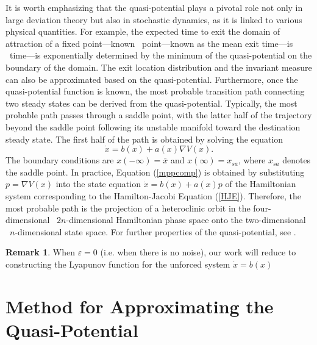 \documentclass[11pt]{article}
\theoremstyle{plain}      %
\theoremstyle{definition} %
\newtheorem{remark}[theorem]{Remark}
\providecommand{\DIFaddtex}[1]{{\protect\color{blue}#1}} %
\providecommand{\DIFdeltex}[1]{{\protect\color{red}#1}} %
\providecommand{\DIFaddbegin}{} %
\providecommand{\DIFaddend}{} %
\providecommand{\DIFdelbegin}{} %
\providecommand{\DIFdelend}{} %
\providecommand{\DIFadd}[1]{\texorpdfstring{\DIFaddtex{#1}}{#1}} %
\providecommand{\DIFdel}[1]{\texorpdfstring{\DIFdeltex{#1}}{}} %
\newcommand{\DIFscaledelfig}{1.0}
\newlength{\DIFdelgraphicswidth} %
\newlength{\DIFdelgraphicsheight} %
\newcommand{\DIFaddincludegraphics}[2][]{{\color{blue}\fbox{\DIFOincludegraphics[#1]{#2}}}} %
\newcommand{\DIFdelincludegraphics}[2][]{%
\sbox{\DIFdelgraphicsbox}{\DIFOincludegraphics[#1]{#2}}%
\settoboxwidth{\DIFdelgraphicswidth}{\DIFdelgraphicsbox} %
\settoboxtotalheight{\DIFdelgraphicsheight}{\DIFdelgraphicsbox} %
\scalebox{\DIFscaledelfig}{%
\parbox[b]{\DIFdelgraphicswidth}{\usebox{\DIFdelgraphicsbox}\\[-\baselineskip] \rule{\DIFdelgraphicswidth}{0em}}\llap{\resizebox{\DIFdelgraphicswidth}{\DIFdelgraphicsheight}{%
\setlength{\unitlength}{\DIFdelgraphicswidth}%
\begin{picture}(1,1)%
\thicklines\linethickness{2pt} %
{\color[rgb]{1,0,0}\put(0,0){\framebox(1,1){}}}%
{\color[rgb]{1,0,0}\put(0,0){\line( 1,1){1}}}%
{\color[rgb]{1,0,0}\put(0,1){\line(1,-1){1}}}%
\end{picture}%
}\hspace*{3pt}}} %
} %
\DeclareRobustCommand{\DIFaddbegin}{\DIFOaddbegin \let\includegraphics\DIFaddincludegraphics} %
\DeclareRobustCommand{\DIFaddend}{\DIFOaddend \let\includegraphics\DIFOincludegraphics} %
\DeclareRobustCommand{\DIFdelbegin}{\DIFOdelbegin \let\includegraphics\DIFdelincludegraphics} %
\DeclareRobustCommand{\DIFdelend}{\DIFOaddend \let\includegraphics\DIFOincludegraphics} %
\begin{document}
It is worth emphasizing that the quasi-potential plays a pivotal role not only in large deviation theory but also in stochastic dynamics, as it is linked to various physical quantities. For example, the expected time to exit the domain of attraction of a fixed \DIFdelbegin \DIFdel{point—known }\DIFdelend\ \DIFaddbegin \DIFadd{point---known }\DIFaddend as the mean exit \DIFdelbegin \DIFdel{time—is }\DIFdelend\ \DIFaddbegin \DIFadd{time---is }\DIFaddend exponentially determined by the minimum of the quasi-potential on the boundary of the domain. The exit location distribution and the invariant measure can also be approximated based on the quasi-potential. Furthermore, once the quasi-potential function is known, the most probable transition path connecting two steady states can be derived from the quasi-potential. Typically, the most probable path passes through a saddle point, with the latter half of the trajectory beyond the saddle point following its unstable manifold toward the destination steady state. The first half of the path is obtained by solving the equation \begin{equation}\label{mppcomp}
\dot{x} = b(x) + a(x) \nabla V(x).
\end{equation}
The boundary conditions are $x(-\infty)=\bar{x}$ and $x(\infty)=x_{sa}$, where $x_{sa}$ denotes the saddle point. In practice, Equation (\ref{mppcomp}) is obtained by substituting $p= \nabla V(x)$ into the state equation $\dot{x} = b(x) + a(x)p$ of the Hamiltonian system corresponding to the Hamilton-Jacobi Equation (\ref{HJE}). Therefore, the most probable path is the projection of a heteroclinic orbit in the \DIFdelbegin \DIFdel{four-dimensional }\DIFdelend\ \DIFaddbegin \DIFadd{$2n$-dimensional }\DIFaddend Hamiltonian phase space onto the \DIFdelbegin \DIFdel{two-dimensional }\DIFdelend\ \DIFaddbegin \DIFadd{$n$-dimensional state }\DIFaddend space. For further properties of the quasi-potential, see \cite{Freidlin2012}. \begin{remark}
When $\varepsilon = 0$ (i.e. when there is no noise), our work will reduce to constructing the Lyapunov function for the unforced system $\dot{x} = b(x)$ \cite{giesl2019approximation, lee2024note}
\end{remark}


\section{Method for Approximating the Quasi-Potential}\label{methsec}
\end{document}
